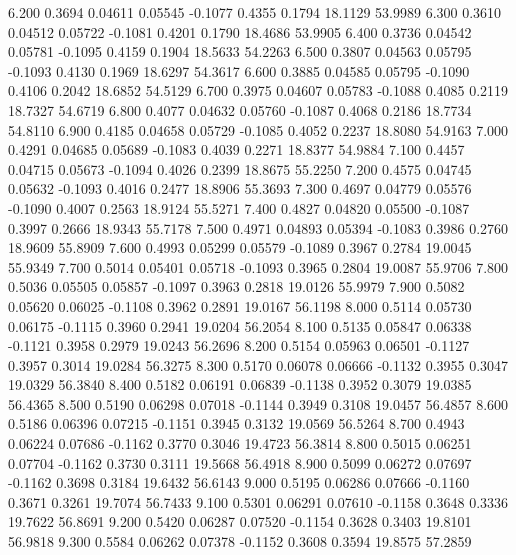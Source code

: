    6.200   0.3694   0.04611   0.05545  -0.1077   0.4355   0.1794  18.1129  53.9989
   6.300   0.3610   0.04512   0.05722  -0.1081   0.4201   0.1790  18.4686  53.9905
   6.400   0.3736   0.04542   0.05781  -0.1095   0.4159   0.1904  18.5633  54.2263
   6.500   0.3807   0.04563   0.05795  -0.1093   0.4130   0.1969  18.6297  54.3617
   6.600   0.3885   0.04585   0.05795  -0.1090   0.4106   0.2042  18.6852  54.5129
   6.700   0.3975   0.04607   0.05783  -0.1088   0.4085   0.2119  18.7327  54.6719
   6.800   0.4077   0.04632   0.05760  -0.1087   0.4068   0.2186  18.7734  54.8110
   6.900   0.4185   0.04658   0.05729  -0.1085   0.4052   0.2237  18.8080  54.9163
   7.000   0.4291   0.04685   0.05689  -0.1083   0.4039   0.2271  18.8377  54.9884
   7.100   0.4457   0.04715   0.05673  -0.1094   0.4026   0.2399  18.8675  55.2250
   7.200   0.4575   0.04745   0.05632  -0.1093   0.4016   0.2477  18.8906  55.3693
   7.300   0.4697   0.04779   0.05576  -0.1090   0.4007   0.2563  18.9124  55.5271
   7.400   0.4827   0.04820   0.05500  -0.1087   0.3997   0.2666  18.9343  55.7178
   7.500   0.4971   0.04893   0.05394  -0.1083   0.3986   0.2760  18.9609  55.8909
   7.600   0.4993   0.05299   0.05579  -0.1089   0.3967   0.2784  19.0045  55.9349
   7.700   0.5014   0.05401   0.05718  -0.1093   0.3965   0.2804  19.0087  55.9706
   7.800   0.5036   0.05505   0.05857  -0.1097   0.3963   0.2818  19.0126  55.9979
   7.900   0.5082   0.05620   0.06025  -0.1108   0.3962   0.2891  19.0167  56.1198
   8.000   0.5114   0.05730   0.06175  -0.1115   0.3960   0.2941  19.0204  56.2054
   8.100   0.5135   0.05847   0.06338  -0.1121   0.3958   0.2979  19.0243  56.2696
   8.200   0.5154   0.05963   0.06501  -0.1127   0.3957   0.3014  19.0284  56.3275
   8.300   0.5170   0.06078   0.06666  -0.1132   0.3955   0.3047  19.0329  56.3840
   8.400   0.5182   0.06191   0.06839  -0.1138   0.3952   0.3079  19.0385  56.4365
   8.500   0.5190   0.06298   0.07018  -0.1144   0.3949   0.3108  19.0457  56.4857
   8.600   0.5186   0.06396   0.07215  -0.1151   0.3945   0.3132  19.0569  56.5264
   8.700   0.4943   0.06224   0.07686  -0.1162   0.3770   0.3046  19.4723  56.3814
   8.800   0.5015   0.06251   0.07704  -0.1162   0.3730   0.3111  19.5668  56.4918
   8.900   0.5099   0.06272   0.07697  -0.1162   0.3698   0.3184  19.6432  56.6143
   9.000   0.5195   0.06286   0.07666  -0.1160   0.3671   0.3261  19.7074  56.7433
   9.100   0.5301   0.06291   0.07610  -0.1158   0.3648   0.3336  19.7622  56.8691
   9.200   0.5420   0.06287   0.07520  -0.1154   0.3628   0.3403  19.8101  56.9818
   9.300   0.5584   0.06262   0.07378  -0.1152   0.3608   0.3594  19.8575  57.2859
